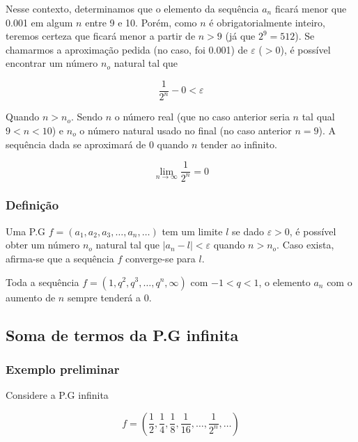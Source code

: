 Nesse contexto, determinamos que o elemento da sequência $a_{n}$ ficará menor que 0.001 em algum $n$ entre 9 e 10. Porém, como $n$ é obrigatorialmente inteiro, teremos certeza que ficará menor a partir de $n > 9$ (já que $2^{9} = 512$). Se chamarmos a aproximação pedida (no caso, foi 0.001) de $\varepsilon$ ($> 0$), é possível encontrar um número $n_{o}$ natural tal que

\[\frac{1}{2^{n}} - 0 < \varepsilon\]

Quando $n > n_{o}$. Sendo $n$ o número real (que no caso anterior seria $n$ tal qual $9 < n < 10$) e $n_{o}$ o número natural usado no final (no caso anterior $n = 9$). A sequência dada se aproximará de 0 quando $n$ tender ao infinito.

\begin{tcolorbox}[colback=LightYellow]
\[\lim_{n\to \infty} \frac{1}{2^{n}} = 0\]
\end{tcolorbox}

\subsubsection{Definição}

Uma P.G $f = (a_{1}, a_{2}, a_{3}, \dots, a_{n}, \dots)$ tem um limite $l$ se dado $\varepsilon > 0$, é possível obter um número $n_{o}$ natural tal que $|a_{n} - l| < \varepsilon$ quando $n > n_{o}$. Caso exista, afirma-se que a sequência $f$ converge-se para $l$.

\begin{tcolorbox}[colback=LightYellow]
Toda a sequência $f = (1, q^{2}, q^{3}, \dots, q^{n}, \infty)$ com $-1 < q < 1$, o elemento $a_{n}$ com o aumento de $n$ sempre tenderá a 0.
\end{tcolorbox}

\subsection{Soma de termos da P.G infinita}

\subsubsection{Exemplo preliminar}

Considere a P.G infinita

\begin{tcolorbox}[colback=LightYellow]
\[f = \left(\frac{1}{2}, \frac{1}{4}, \frac{1}{8}, \frac{1}{16}, \dots, \frac{1}{2^{n}}, \dots \right)\]
\end{tcolorbox}

